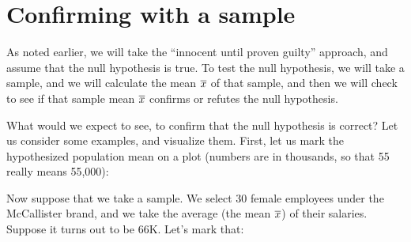 \documentclass[../../../main.tex]{subfiles}
\begin{document}
\section{Confirming with a sample}

As noted earlier, we will take the ``innocent until proven guilty'' approach, and assume that the null hypothesis is true. To test the null hypothesis, we will take a sample, and we will calculate the mean $\overline{x}$ of that sample, and then we will check to see if that sample mean $\overline{x}$ confirms or refutes the null hypothesis. 

What would we expect to see, to confirm that the null hypothesis is correct? Let us consider some examples, and visualize them. First, let us mark the hypothesized population mean on a plot (numbers are in thousands, so that 55 really means 55,000):

\begin{center}
\end{center}

\noindent
Now suppose that we take a sample. We select 30 female employees under the McCallister brand, and we take the average (the mean $\overline{x}$) of their salaries. Suppose it turns out to be 66K. Let's mark that:

\begin{center}
\end{center}
\end{document}
